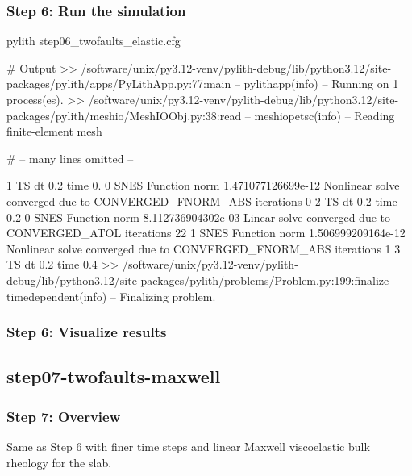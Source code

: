 \documentclass[aspectratio=169]{beamer}
\begin{document}
\begin{frame}[fragile]
  \frametitle{Step 6: Run the simulation}
  \summary{}

\begin{bashcode}
pylith step06_twofaults_elastic.cfg

# Output
 >> /software/unix/py3.12-venv/pylith-debug/lib/python3.12/site-packages/pylith/apps/PyLithApp.py:77:main
 -- pylithapp(info)
 -- Running on 1 process(es).
 >> /software/unix/py3.12-venv/pylith-debug/lib/python3.12/site-packages/pylith/meshio/MeshIOObj.py:38:read
 -- meshiopetsc(info)
 -- Reading finite-element mesh

# -- many lines omitted --

1 TS dt 0.2 time 0.
    0 SNES Function norm 1.471077126699e-12
    Nonlinear solve converged due to CONVERGED_FNORM_ABS iterations 0
2 TS dt 0.2 time 0.2
    0 SNES Function norm 8.112736904302e-03
      Linear solve converged due to CONVERGED_ATOL iterations 22
    1 SNES Function norm 1.506999209164e-12
    Nonlinear solve converged due to CONVERGED_FNORM_ABS iterations 1
3 TS dt 0.2 time 0.4
 >> /software/unix/py3.12-venv/pylith-debug/lib/python3.12/site-packages/pylith/problems/Problem.py:199:finalize
 -- timedependent(info)
 -- Finalizing problem.
\end{bashcode}
  
\end{frame}


\begin{frame}
  \frametitle{Step 6: Visualize results}

    
\end{frame}


\subsection{step07-twofaults-maxwell}

\begin{frame}
  \frametitle{Step 7: Overview}

  Same as Step 6 with finer time steps and linear Maxwell viscoelastic bulk rheology for the slab.
      
\end{frame}
\end{document}
